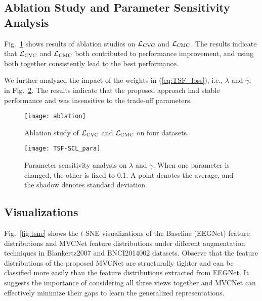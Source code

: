 \documentclass[journal]{IEEEtran}
\begin{document}
\subsection{Ablation Study and Parameter Sensitivity Analysis}
Fig.~\ref{fig:ablation} shows results of ablation studies on $\mathcal{L}_\textmd{CVC}$ and $\mathcal{L}_\textmd{CMC}$. The results indicate that $\mathcal{L}_\textmd{CVC}$ and $\mathcal{L}_\textmd{CMC}$ both contributed to performance improvement, and using both together consistently lead to the best performance.

We further analyzed the impact of the weights in (\ref{eq:TSF_loss}), i.e., $\lambda$ and $\gamma$, in Fig.~\ref{fig:para_ana}. The results indicate that the proposed approach had stable performance and was insensitive to the trade-off parameters.

\begin{figure}[htpb]\centering
\texttt{[image: ablation]}
\caption{Ablation study of $\mathcal{L}_\textmd{CVC}$ and $\mathcal{L}_\textmd{CMC}$ on four datasets.} \label{fig:ablation}
\end{figure}

\begin{figure}[htpb]\centering
\texttt{[image: TSF-SCL\_para]}
\caption{Parameter sensitivity analysis on $\lambda$ and $\gamma$. When one parameter is changed, the other is fixed to 0.1. A point denotes the average, and the shadow denotes standard deviation.} \label{fig:para_ana}
\end{figure}

\subsection{Visualizations}
Fig.~\ref{fig:tsne} shows the $t$-SNE \cite{VanderMaaten2008} visualizations of the Baseline (EEGNet) feature distributions and MVCNet feature distributions under different augmentation techniques in Blankertz2007 and BNCI2014002 datasets. Observe that the feature distributions of the proposed MVCNet are structurally tighter and can be classified more easily than the feature distributions extracted from EEGNet. It suggests the importance of considering all three views together and MVCNet can effectively minimize their gaps to learn the generalized representations. 

\begin{figure*}[htpb]\centering
{}
\caption{$t$-SNE visualization of (a) EEGNet features and (b) MVCNet features extracted from Subject S1-S7 of Blankertz2007; (c) EEGNet features and (d) MVCNet features extracted from Subject S1-S14 of BNCI2014002. Different colors represent trials transformed through different augmentation approaches, including CR (spatial domain), Scale (time domain), and Shift (frequency domain). The dots and crosses represent trials of different categories.} \label{fig:tsne}
\end{figure*}
\end{document}
